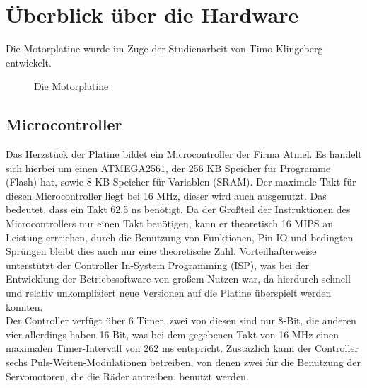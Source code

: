 \chapter{Überblick über die Hardware}

Die Motorplatine wurde im Zuge der Studienarbeit von Timo Klingeberg \cite{STUD_TIMO}
entwickelt.
\begin{figure}[htb]
 \centering
 \caption{\label{board}Die Motorplatine}
\end{figure}
\section{Microcontroller}
Das Herzstück der Platine bildet ein Microcontroller der Firma Atmel.
Es handelt sich hierbei um einen ATMEGA2561\cite{ATMEGA_MANUAL}, der 256 KB Speicher für
Programme (Flash) hat, sowie 8 KB Speicher für Variablen (SRAM). Der maximale Takt für
diesen Microcontroller liegt bei 16 MHz, dieser wird auch ausgenutzt. Das bedeutet, dass
ein Takt 62,5 ns benötigt. Da der Großteil der Instruktionen des Microcontrollers nur
einen Takt benötigen, kann er theoretisch 16 MIPS an Leistung erreichen, durch die Benutzung
von Funktionen, Pin-IO und bedingten Sprüngen bleibt dies auch nur eine theoretische Zahl.
Vorteilhafterweise unterstützt der Controller In-System Programming (ISP), was bei der
Entwicklung der Betriebssoftware von großem Nutzen war, da hierdurch schnell und relativ
unkompliziert neue Versionen auf die Platine überspielt werden konnten.\\
Der Controller verfügt über 6 Timer, zwei von diesen sind nur 8-Bit, die anderen vier allerdings
haben 16-Bit, was bei dem gegebenen Takt von 16 MHz einen maximalen Timer-Intervall von 262 ms
entspricht. Zustäzlich kann der Controller sechs Puls-Weiten-Modulationen betreiben, von
denen zwei für die Benutzung der Servomotoren, die die Räder antreiben, benutzt werden.
